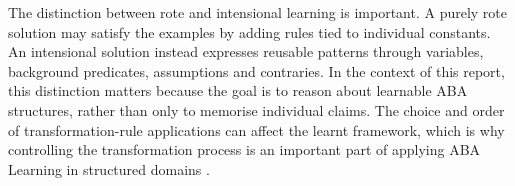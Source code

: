 The distinction between rote and intensional learning is important. A purely rote solution may satisfy the examples by adding rules tied to individual constants. An intensional solution instead expresses reusable patterns through variables, background predicates, assumptions and contraries. In the context of this report, this distinction matters because the goal is to reason about learnable ABA structures, rather than only to memorise individual claims. The choice and order of transformation-rule applications can affect the learnt framework, which is why controlling the transformation process is an important part of applying ABA Learning in structured domains \cite{de2025greedy}.
